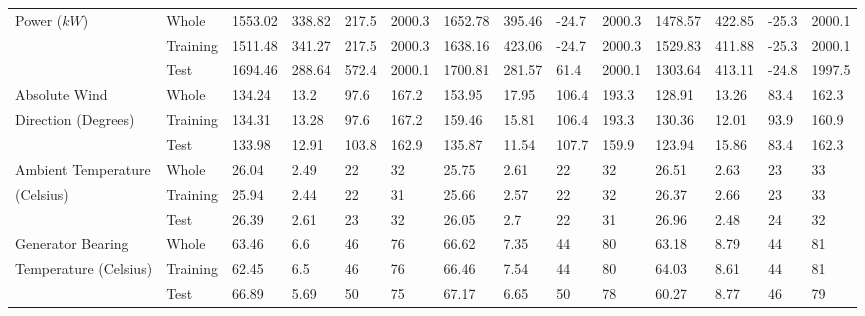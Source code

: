 \begin{landscape}
\begin{scriptsize}
\begin{center}
\begin{longtable}[htb!]{llllll|llll|llll}
                                         
Power ($kW$)                             & Whole                    & 1553.02 & 338.82 & 217.5  & 2000.3 & 1652.78 & 395.46 & -24.7 & 2000.3 & 1478.57 & 422.85 & -25.3 & 2000.1 \\
                                         & Training                 & 1511.48 & 341.27 & 217.5  & 2000.3 & 1638.16 & 423.06 & -24.7 & 2000.3 & 1529.83 & 411.88 & -25.3 & 2000.1 \\
                                         & Test                     & 1694.46 & 288.64 & 572.4  & 2000.1 & 1700.81 & 281.57 & 61.4  & 2000.1 & 1303.64 & 413.11 & -24.8 & 1997.5 \\ \hline
Absolute Wind                            & Whole                    & 134.24  & 13.2   & 97.6   & 167.2  & 153.95  & 17.95  & 106.4 & 193.3  & 128.91  & 13.26  & 83.4  & 162.3  \\
Direction (Degrees)                      & Training                 & 134.31  & 13.28  & 97.6   & 167.2  & 159.46  & 15.81  & 106.4 & 193.3  & 130.36  & 12.01  & 93.9  & 160.9  \\
                                         & Test                     & 133.98  & 12.91  & 103.8  & 162.9  & 135.87  & 11.54  & 107.7 & 159.9  & 123.94  & 15.86  & 83.4  & 162.3  \\ \hline
Ambient Temperature                      & Whole                    & 26.04   & 2.49   & 22     & 32     & 25.75   & 2.61   & 22    & 32     & 26.51   & 2.63   & 23    & 33     \\
(Celsius)                                & Training                 & 25.94   & 2.44   & 22     & 31     & 25.66   & 2.57   & 22    & 32     & 26.37   & 2.66   & 23    & 33     \\
                                         & Test                     & 26.39   & 2.61   & 23     & 32     & 26.05   & 2.7    & 22    & 31     & 26.96   & 2.48   & 24    & 32     \\ \hline
Generator Bearing                        & Whole                    & 63.46   & 6.6    & 46     & 76     & 66.62   & 7.35   & 44    & 80     & 63.18   & 8.79   & 44    & 81     \\
Temperature (Celsius)                    & Training                 & 62.45   & 6.5    & 46     & 76     & 66.46   & 7.54   & 44    & 80     & 64.03   & 8.61   & 44    & 81     \\
                                         & Test                     & 66.89   & 5.69   & 50     & 75     & 67.17   & 6.65   & 50    & 78     & 60.27   & 8.77   & 46    & 79     \\ \hline

\end{longtable}
\end{center}
\end{scriptsize}
\end{landscape}
